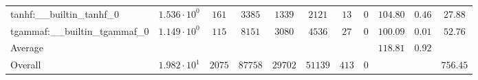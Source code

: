 \begin{tabular}{|l|c|c|c|c|c|c|c|c|c|c|}
tanhf:\_\_builtin\_tanhf\_0               & $ 1.536 \cdot 10^{0}  $ & $ 161    $ & $ 3385  $ & $ 1339  $ & $ 2121  $ & $ 13  $ & $ 0 $ & $ 104.80      $ & $ 0.46    $ & $ 27.88   $ \\
tgammaf:\_\_builtin\_tgammaf\_0           & $ 1.149 \cdot 10^{0}  $ & $ 115    $ & $ 8151  $ & $ 3080  $ & $ 4536  $ & $ 27  $ & $ 0 $ & $ 100.09      $ & $ 0.01    $ & $ 52.76   $ \\
\hline
Average                                   & $                     $ & $        $ & $       $ & $       $ & $       $ & $     $ & $   $ & $ 118.81      $ & $ 0.92    $ & $         $ \\
\hline
Overall                                   & $ 1.982 \cdot 10^{1}  $ & $ 2075   $ & $ 87758 $ & $ 29702 $ & $ 51139 $ & $ 413 $ & $ 0 $ & $             $ & $         $ & $ 756.45  $ \\
\hline
\end{tabular}
